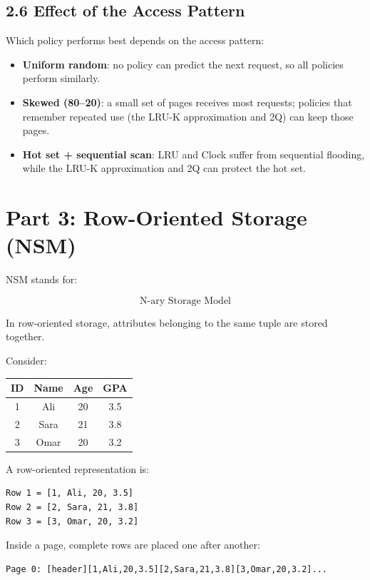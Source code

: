 \documentclass[12pt,a4paper]{article}
\begin{document}
\subsection{2.6 Effect of the Access Pattern}

Which policy performs best depends on the access pattern:

\begin{itemize}
    \item \textbf{Uniform random}: no policy can predict the next request, so all policies perform similarly.
    \item \textbf{Skewed (80--20)}: a small set of pages receives most requests; policies that remember repeated use (the LRU-K approximation and 2Q) can keep those pages.
    \item \textbf{Hot set + sequential scan}: LRU and Clock suffer from sequential flooding, while the LRU-K approximation and 2Q can protect the hot set.
\end{itemize}

\section{Part 3: Row-Oriented Storage (NSM)}

NSM stands for:

\[
\boxed{\text{N-ary Storage Model}}
\]

In row-oriented storage, attributes belonging to the same tuple are stored together.

Consider:

\begin{center}
\begin{tabular}{c|c|c|c}
\toprule
ID & Name & Age & GPA \\
\midrule
1 & Ali & 20 & 3.5 \\
2 & Sara & 21 & 3.8 \\
3 & Omar & 20 & 3.2 \\
\bottomrule
\end{tabular}
\end{center}

A row-oriented representation is:

\begin{verbatim}
Row 1 = [1, Ali, 20, 3.5]
Row 2 = [2, Sara, 21, 3.8]
Row 3 = [3, Omar, 20, 3.2]
\end{verbatim}

Inside a page, complete rows are placed one after another:

\begin{verbatim}
Page 0: [header][1,Ali,20,3.5][2,Sara,21,3.8][3,Omar,20,3.2]...
\end{verbatim}
\end{document}
